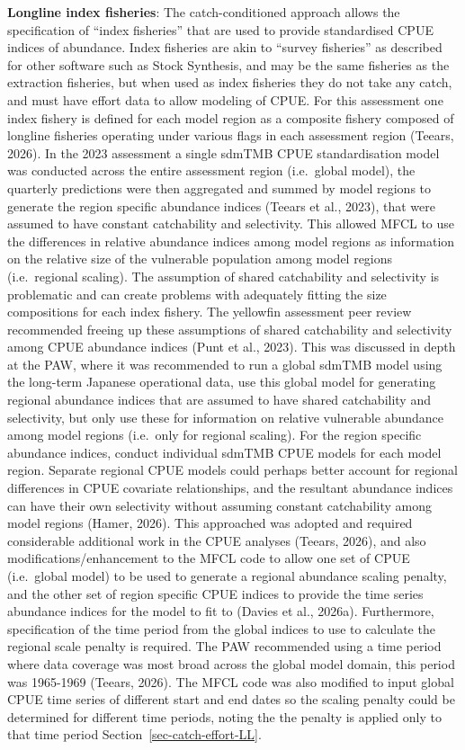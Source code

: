 \documentclass[
  english,
  a4paper,
  a4paper,
  11pt]{SCreport}
\begin{document}
\textbf{Longline index fisheries}: The catch-conditioned approach allows
the specification of ``index fisheries'' that are used to provide
standardised CPUE indices of abundance. Index fisheries are akin to
``survey fisheries'' as described for other software such as Stock
Synthesis, and may be the same fisheries as the extraction fisheries,
but when used as index fisheries they do not take any catch, and must
have effort data to allow modeling of CPUE. For this assessment one
index fishery is defined for each model region as a composite fishery
composed of longline fisheries operating under various flags in each
assessment region (Teears, 2026). In the 2023 assessment a single sdmTMB
CPUE standardisation model was conducted across the entire assessment
region (i.e.~global model), the quarterly predictions were then
aggregated and summed by model regions to generate the region specific
abundance indices (Teears et al., 2023), that were assumed to have
constant catchability and selectivity. This allowed MFCL to use the
differences in relative abundance indices among model regions as
information on the relative size of the vulnerable population among
model regions (i.e.~regional scaling). The assumption of shared
catchability and selectivity is problematic and can create problems with
adequately fitting the size compositions for each index fishery. The
yellowfin assessment peer review recommended freeing up these
assumptions of shared catchability and selectivity among CPUE abundance
indices (Punt et al., 2023). This was discussed in depth at the PAW,
where it was recommended to run a global sdmTMB model using the
long-term Japanese operational data, use this global model for
generating regional abundance indices that are assumed to have shared
catchability and selectivity, but only use these for information on
relative vulnerable abundance among model regions (i.e.~only for
regional scaling). For the region specific abundance indices, conduct
individual sdmTMB CPUE models for each model region. Separate regional
CPUE models could perhaps better account for regional differences in
CPUE covariate relationships, and the resultant abundance indices can
have their own selectivity without assuming constant catchability among
model regions (Hamer, 2026). This approached was adopted and required
considerable additional work in the CPUE analyses (Teears, 2026), and
also modifications/enhancement to the MFCL code to allow one set of CPUE
(i.e.~global model) to be used to generate a regional abundance scaling
penalty, and the other set of region specific CPUE indices to provide
the time series abundance indices for the model to fit to (Davies et
al., 2026a). Furthermore, specification of the time period from the
global indices to use to calculate the regional scale penalty is
required. The PAW recommended using a time period where data coverage
was most broad across the global model domain, this period was 1965-1969
(Teears, 2026). The MFCL code was also modified to input global CPUE
time series of different start and end dates so the scaling penalty
could be determined for different time periods, noting the the penalty
is applied only to that time period Section~\ref{sec-catch-effort-LL}.
\end{document}
